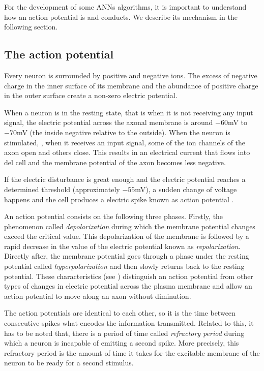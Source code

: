 For the development of some ANNs algorithms, it is important to understand how an action potential is and conducts. We describe its mechanism in the following section.

\subsection{The action potential}
\label{subsec:actionpotential}
Every neuron is surrounded by positive and negative ions. 
The excess of negative charge in the inner surface of its membrane and the abundance of positive charge in the outer surface create a non-zero electric potential.

When a neuron is in the resting state, that is when it is not receiving any input signal, the electric potential across the axonal membrane is around $-60$mV to $-70$mV (the inside negative relative to the outside). When the neuron is stimulated, \ie, when it receives an input signal, some of the ion channels of the axon open and others close. This results in an electrical current that flows into del cell and the membrane potential of the axon becomes less negative.

If the electric disturbance is great enough and the electric potential reaches a determined threshold (approximately $-55$mV), a sudden change of voltage happens and the cell produces a electric spike known as action potential \cite{cellBiology}. 

An action potential consists on the following three phases. Firstly, the phenomenon called \emph{depolarization} during which the membrane potential changes exceed the critical value.
This depolarization of the membrane is followed by a rapid decrease in the value of the electric potential known as \emph{repolarization}.
Directly after, the membrane potential goes through a phase under the resting potential called \emph{hyperpolarization} and then slowly returns back to the resting potential.
These characteristics (see ) distinguish an action potential from other types of changes in electric potential across the plasma membrane and allow an action potential to move along an axon without diminution. 

The action potentials are identical to each other, so it is the time between consecutive spikes what encodes the information transmitted. Related to this, it has to be noted that, there is a period of time called \emph{refractory period} during which a neuron is incapable of emitting a second spike. More precisely, this refractory period is the amount of time it takes for the excitable membrane of the neuron to be ready for a second stimulus.

